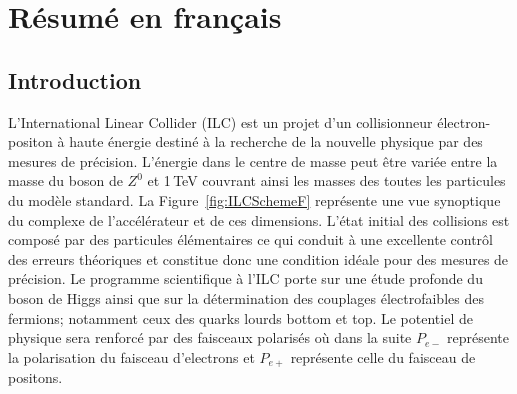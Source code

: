 \section{R\'esum\'e en fran\c cais}

\renewcommand{\sm}{modèle standard}
\renewcommand{\bsm}{au delà du modèle standard}
\subsection*{Introduction}


L'International Linear Collider \cite{bib:ILC} (ILC) est un projet d'un collisionneur électron-positon à haute énergie destiné à la recherche de la nouvelle physique par des mesures de précision.
L’énergie dans le centre de masse peut être variée entre la masse du boson de $Z^0$ et 1\,TeV couvrant ainsi les masses des toutes les particules du modèle standard. 
La Figure~\ref{fig:ILCSchemeF} représente une vue synoptique du complexe de l’accélérateur et de ces dimensions. 
L’état initial des collisions est composé par des particules élémentaires ce qui conduit à une excellente contrôl des erreurs théoriques et constitue donc une condition idéale pour des mesures de précision. Le programme scientifique à l'ILC porte sur une étude profonde du boson de Higgs ainsi que sur la détermination des couplages électrofaibles des fermions; notamment ceux des quarks lourds bottom et top. Le potentiel de physique sera renforcé par des faisceaux polarisés où dans la suite $P_{e-}$ représente la polarisation du faisceau d’electrons et $P_{e+}$ représente celle du faisceau de positons.



